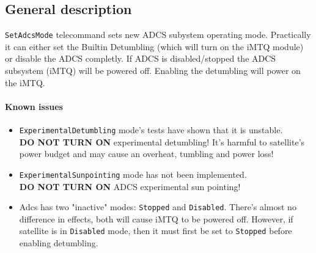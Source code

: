 

\subsection{General description}
\texttt{SetAdcsMode} telecommand sets new ADCS subystem operating mode. Practically it can either set the Builtin Detumbling (which will turn on the iMTQ module) or disable the ADCS completly. If ADCS is disabled/stopped the ADCS subsystem (iMTQ) will be powered off. Enabling the detumbling will power on the iMTQ.

\paragraph{Known issues}
\begin{itemize}
    \item \danger \texttt{ExperimentalDetumbling} mode's tests have shown that it is unstable. \\
    \textbf{DO NOT TURN ON} experimental detumbling! It's harmful to satellite's power budget and may cause an overheat, tumbling and power loss! 
    \item \danger \texttt{ExperimentalSunpointing} mode has not been implemented.  \\
    \textbf{DO NOT TURN ON} ADCS experimental sun pointing!
    \item \warn Adcs has two "inactive" modes: \texttt{Stopped} and \texttt{Disabled}. There's almost no difference in effects, both will cause iMTQ to be powered off. However, if satellite is in \texttt{Disabled} mode, then it must first be set to \texttt{Stopped} before enabling detumbling.
\end{itemize}

